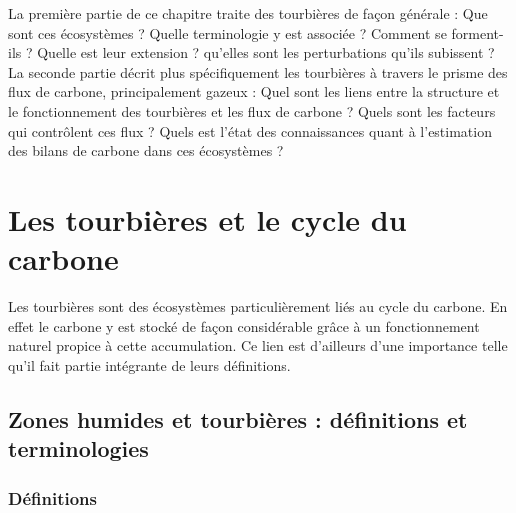\newpage
\doublespacing
{}
La première partie de ce chapitre traite des tourbières de façon générale : Que sont ces écosystèmes ?
Quelle terminologie y est associée ? Comment se forment-ils ? Quelle est leur extension ? qu'elles sont les perturbations qu'ils subissent ?
La seconde partie décrit plus spécifiquement les tourbières à travers le prisme des flux de carbone, principalement gazeux : 
Quel sont les liens entre la structure et le fonctionnement des tourbières et les flux de carbone ? 
Quels sont les facteurs qui contrôlent ces flux ? 
Quels est l'état des connaissances quant à l'estimation des bilans de carbone dans ces écosystèmes ?

\section{Les tourbières et le cycle du carbone}

Les tourbières sont des écosystèmes particulièrement liés au cycle du carbone.
En effet le carbone y est stocké de façon considérable grâce à un fonctionnement naturel propice à cette accumulation.
Ce lien est d'ailleurs d'une importance telle qu'il fait partie intégrante de leurs définitions.


\subsection{Zones humides et tourbières : définitions et terminologies}

\subsubsection{Définitions}

